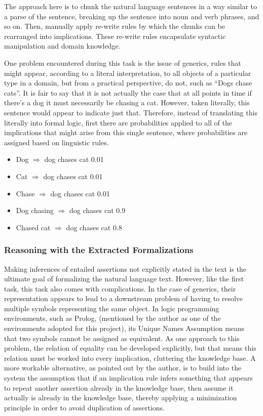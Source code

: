 The approach here is to chunk the natural language sentences in a way similar to a parse of the sentence, breaking up the sentence into noun and verb phrases, and so on.  Then, manually apply re-write rules by which the chunks can be rearranged into implications.  These re-write rules encapsulate syntactic manipulation and domain knowledge.

One problem encountered during this task is the issue of generics, rules that might appear, according to a literal interpretation, to all objects of a particular type in a domain, but from a practical perspective, do not, such as ``Dogs chase cats”.  It is fair to say that it is not actually the case that at all points in time if there’s a dog it must necessarily be chasing a cat.  However, taken literally, this sentence would appear to indicate just that.  Therefore, instead of translating this literally into formal logic, first there are probabilities applied to all of the implications that might arise from this single sentence, where probabilities are assigned based on linguistic rules.

\begin{itemize}
\item Dog $\Rightarrow$ dog chases cat 0.01
\item Cat $\Rightarrow$ dog chases cat 0.01
\item Chase $\Rightarrow$ dog chases cat 0.01
\item Dog chasing $\Rightarrow$ dog chases cat 0.9
\item Chased cat $\Rightarrow$ dog chases cat 0.8 \cite{clark2015elementary}
\end{itemize}

\subsubsection{Reasoning with the Extracted Formalizations}

Making inferences of entailed assertions not explicitly stated in the text is the ultimate goal of formalizing the natural language text.  However, like the first task, this task also comes with complications.  In the case of generics, their representation appears to lead to a downstream problem of having to resolve multiple symbols representing the same object.  In logic programming environments, such as Prolog, (mentioned by the author as one of the environments adopted for this project), its Unique Names Assumption means that two symbols cannot be assigned as equivalent.  As one approach to this problem, the relation of equality can be developed explicitly, but that means this relation must be worked into every implication, cluttering the knowledge base.  A more workable alternative, as pointed out by the author, is to build into the system the assumption that if an implication rule infers something that appears to repeat another assertion already in the knowledge base, then assume it actually is already in the knowledge base, thereby applying a minimization principle in order to avoid duplication of assertions.


